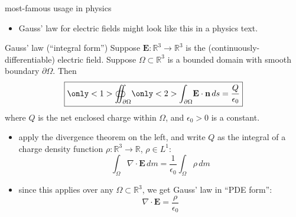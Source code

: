 \documentclass[10pt,
               svgnames,
               hyperref={colorlinks,
                         citecolor=DeepPink4,
                         linkcolor=FireBrick,
                         urlcolor=blue},
               usepdftitle=false]{beamer}
\newcommand{\bn}{\mathbf{n}}
\newcommand{\bE}{\mathbf{E}}
\newcommand{\RR}{\mathbb{R}}
\newcommand{\Div}{\nabla\cdot}
\newcommand{\eps}{\epsilon}
\begin{document}
\begin{frame}{most-famous usage in physics}

{\small
\begin{itemize}
\item Gauss' law for electric fields might look like this in a physics text.
\end{itemize}

\begin{block}{Gauss' law (``integral form'')}
Suppose $\bE:\RR^3\to\RR^3$ is the (continuously-differentiable) electric field.  Suppose $\Omega \subset \RR^3$ is a bounded domain with smooth boundary $\partial\Omega$.  Then
	$$\boxed{\only<1>{\oiint_{\partial\Omega}}\only<2>{\int_{\partial\Omega}} \bE \cdot \bn \,ds = \frac{Q}{\eps_0}}$$
where $Q$ is the net enclosed charge within $\Omega$, and $\eps_0>0$ is a constant.
\end{block}

\begin{itemize}
\item apply the divergence theorem on the left, and write $Q$ as the integral of a charge density function $\rho:\RR^3\to\RR$, $\rho \in L^1$:
	$$\int_\Omega \Div \bE \,dm = \frac{1}{\eps_0} \int_\Omega \rho\,dm$$
\item since this applies over any $\Omega\subset \RR^3$, we get Gauss' law in ``PDE form'':
	$$\boxed{\Div \bE = \frac{\rho}{\eps_0}}$$
\end{itemize}
}
\end{frame}
\end{document}

